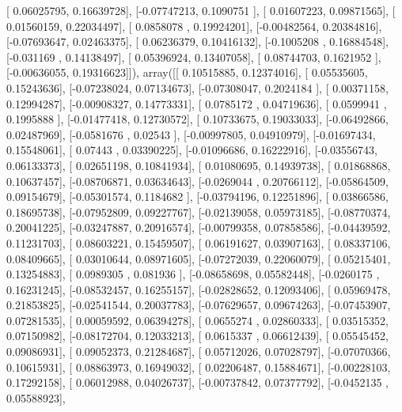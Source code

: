 \documentclass{article}
\begin{document}
       [ 0.06025795,  0.16639728],
       [-0.07747213,  0.1090751 ],
       [ 0.01607223,  0.09871565],
       [ 0.01560159,  0.22034497],
       [ 0.0858078 ,  0.19924201],
       [-0.00482564,  0.20384816],
       [-0.07693647,  0.02463375],
       [ 0.06236379,  0.10416132],
       [-0.1005208 ,  0.16884548],
       [-0.031169  ,  0.14138497],
       [ 0.05396924,  0.13407058],
       [ 0.08744703,  0.1621952 ],
       [-0.00636055,  0.19316623]]), array([[ 0.10515885,  0.12374016],
       [ 0.05535605,  0.15243636],
       [-0.07238024,  0.07134673],
       [-0.07308047,  0.2024184 ],
       [ 0.00371158,  0.12994287],
       [-0.00908327,  0.14773331],
       [ 0.0785172 ,  0.04719636],
       [ 0.0599941 ,  0.1995888 ],
       [-0.01477418,  0.12730572],
       [ 0.10733675,  0.19033033],
       [-0.06492866,  0.02487969],
       [-0.0581676 ,  0.02543   ],
       [-0.00997805,  0.04910979],
       [-0.01697434,  0.15548061],
       [ 0.07443   ,  0.03390225],
       [-0.01096686,  0.16222916],
       [-0.03556743,  0.06133373],
       [ 0.02651198,  0.10841934],
       [ 0.01080695,  0.14939738],
       [ 0.01868868,  0.10637457],
       [-0.08706871,  0.03634643],
       [-0.0269044 ,  0.20766112],
       [-0.05864509,  0.09154679],
       [-0.05301574,  0.1184682 ],
       [-0.03794196,  0.12251896],
       [ 0.03866586,  0.18695738],
       [-0.07952809,  0.09227767],
       [-0.02139058,  0.05973185],
       [-0.08770374,  0.20041225],
       [-0.03247887,  0.20916574],
       [-0.00799358,  0.07858586],
       [-0.04439592,  0.11231703],
       [ 0.08603221,  0.15459507],
       [ 0.06191627,  0.03907163],
       [ 0.08337106,  0.08409665],
       [ 0.03010644,  0.08971605],
       [-0.07272039,  0.22060079],
       [ 0.05215401,  0.13254883],
       [ 0.0989305 ,  0.081936  ],
       [-0.08658698,  0.05582448],
       [-0.0260175 ,  0.16231245],
       [-0.08532457,  0.16255157],
       [-0.02828652,  0.12093406],
       [ 0.05969478,  0.21853825],
       [-0.02541544,  0.20037783],
       [-0.07629657,  0.09674263],
       [-0.07453907,  0.07281535],
       [ 0.00059592,  0.06394278],
       [ 0.0655274 ,  0.02860333],
       [ 0.03515352,  0.07150982],
       [-0.08172704,  0.12033213],
       [ 0.0615337 ,  0.06612439],
       [ 0.05545452,  0.09086931],
       [ 0.09052373,  0.21284687],
       [ 0.05712026,  0.07028797],
       [-0.07070366,  0.10615931],
       [ 0.08863973,  0.16949032],
       [ 0.02206487,  0.15884671],
       [-0.00228103,  0.17292158],
       [ 0.06012988,  0.04026737],
       [-0.00737842,  0.07377792],
       [-0.0452135 ,  0.05588923],
\end{document}
